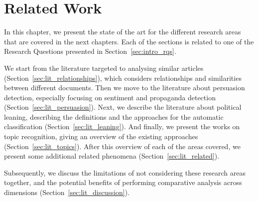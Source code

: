 \chapter{\statusgreen Related Work}
\label{chap:literature}


In this chapter, we present the state of the art for the different research areas that are covered in the next chapters. Each of the sections is related to one of the Research Questions presented in Section~\ref{sec:intro_rqs}.

We start from the literature targeted to analysing similar articles (Section~\ref{sec:lit_relationships}), which considers relationships and similarities between different documents.
Then we move to the literature about persuasion detection, especially focusing on sentiment and propaganda detection (Section~\ref{sec:lit_persuasion}).
Next, we describe the literature about political leaning, describing the definitions and the approaches for the automatic classification (Section~\ref{sec:lit_leaning}).
And finally, we present the works on topic recognition, giving an overview of the existing approaches (Section~\ref{sec:lit_topics}).
After this overview of each of the areas covered, we present some additional related phenomena (Section~\ref{sec:lit_related}).

Subsequently, we discuss the limitations of not considering these research areas together, and the potential benefits of performing comparative analysis across dimensions (Section~\ref{sec:lit_discussion}).

